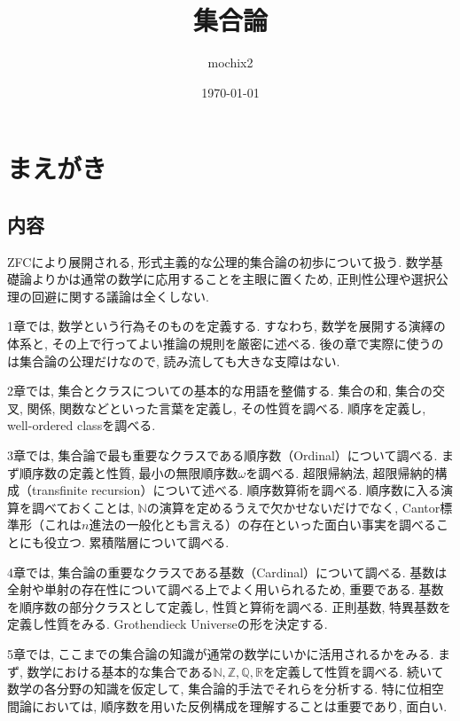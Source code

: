 \documentclass[a4paper, twoside]{bxjsarticle}
\title{集合論}
\author{mochix2}
\date{\today}
\newcommand{\nat}{\mathbb{N}}
\newcommand{\zah}{\mathbb{Z}}
\newcommand{\quo}{\mathbb{Q}}
\newcommand{\rea}{\mathbb{R}}
\theoremstyle{definition}
\begin{document}
    \maketitle
    
    \pagestyle{fancy}
    \lhead[\leftmark]{\thepage}
    \rhead[\thepage]{\rightmark}
    \cfoot{\thepage}

    \cleardoublepage
    \section*{まえがき}
    \subsection*{内容}
        ZFCにより展開される, 形式主義的な公理的集合論の初歩について扱う. 数学基礎論よりかは通常の数学に応用することを主眼に置くため, 正則性公理や選択公理の回避に関する議論は全くしない. 
        
        1章では, 数学という行為そのものを定義する. すなわち, 数学を展開する演繹の体系と, その上で行ってよい推論の規則を厳密に述べる. 後の章で実際に使うのは集合論の公理だけなので, 読み流しても大きな支障はない.
        
        2章では, 集合とクラスについての基本的な用語を整備する. 集合の和, 集合の交叉, 関係, 関数などといった言葉を定義し, その性質を調べる. 順序を定義し, well-ordered classを調べる.
        
        3章では, 集合論で最も重要なクラスである順序数（Ordinal）について調べる. まず順序数の定義と性質, 最小の無限順序数$\omega$を調べる. 超限帰納法, 超限帰納的構成（transfinite recursion）について述べる. 順序数算術を調べる. 順序数に入る演算を調べておくことは, $\nat$の演算を定めるうえで欠かせないだけでなく, Cantor標準形（これは$n$進法の一般化とも言える）の存在といった面白い事実を調べることにも役立つ. 累積階層について調べる.
        
        4章では, 集合論の重要なクラスである基数（Cardinal）について調べる. 基数は全射や単射の存在性について調べる上でよく用いられるため, 重要である. 基数を順序数の部分クラスとして定義し, 性質と算術を調べる. 正則基数, 特異基数を定義し性質をみる. Grothendieck Universeの形を決定する.
        
        5章では, ここまでの集合論の知識が通常の数学にいかに活用されるかをみる. まず, 数学における基本的な集合である$\nat, \zah, \quo, \rea$を定義して性質を調べる. 続いて数学の各分野の知識を仮定して, 集合論的手法でそれらを分析する. 特に位相空間論においては, 順序数を用いた反例構成を理解することは重要であり, 面白い.
        
\end{document}
